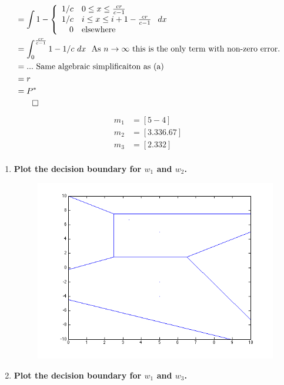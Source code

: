 \documentclass[12pt]{article}
\begin{document}
\begin{enumerate}
\begin{enumerate}
\begin{equation}
\begin{split}
   &= \int 1- \left\{ \begin{array}{rl} 1/c & 0\leq x \leq \frac{cr}{c-1} \\ 1/c & i \leq x \leq i+1-\frac{cr}{c-1} \\ 0 & \text{elsewhere} \end{array} \right. dx \\
   &= \int_0^\frac{cr}{c-1}1-1/c~dx~~\text{As $n \to \infty$ this is the only term with non-zero error.} \\
   &= ...~\text{Same algebraic simplificaiton as (a)} \\
   &=r \\
   &=P^* \\
   & \qed
\end{split}
\end{equation}
\begin{equation}
\begin{split}
m_1 &= [5 -4] \\
m_2 &= [3.33 6.67] \\
m_3 &= [2.33 2] \\
\end{split}
\end{equation}
\newpage
\begin{enumerate}
\item \textbf{Plot the decision boundary for $w_1$ and $w_2$.}
\begin{figure}[H]
\centering
\includegraphics[width=5in]{12.png}
\end{figure}
\item \textbf{Plot the decision boundary for $w_1$ and $w_3$.}
\begin{figure}[H]

\end{figure}
\end{enumerate}
\end{enumerate}
\end{enumerate}
\end{document}
